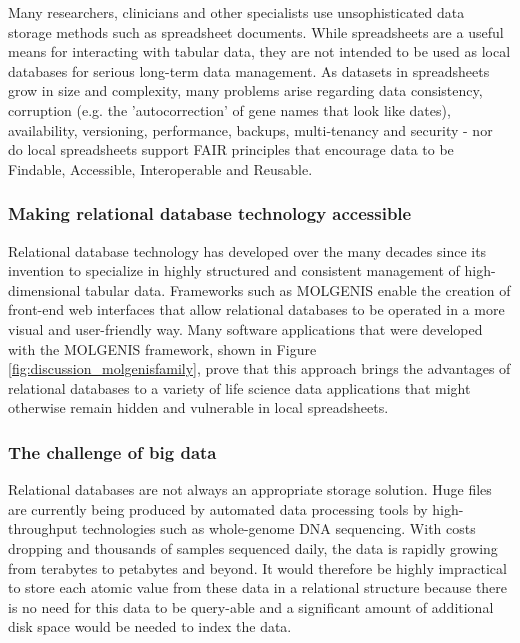 Many researchers, clinicians and other specialists use unsophisticated data storage methods such as spreadsheet documents.
While spreadsheets are a useful means for interacting with tabular data, they are not intended to be used as local databases for serious long-term data management.
As datasets in spreadsheets grow in size and complexity, many problems arise regarding data consistency\cite{Ziemann_2016}, corruption (e.g. the 'autocorrection' of gene names that look like dates\cite{Zeeberg_2004}), availability, versioning, performance, backups, multi-tenancy and security - nor do local spreadsheets support FAIR principles\cite{Wilkinson_2016,Wilkinson_2017} that encourage data to be Findable, Accessible, Interoperable and Reusable.

\subsubsection*{Making relational database technology accessible}

Relational database technology has developed over the many decades since its invention\cite{Codd_1970} to specialize in highly structured and consistent management of high-dimensional tabular data.
Frameworks such as MOLGENIS enable the creation of front-end web interfaces that allow relational databases to be operated in a more visual and user-friendly way.
Many software applications that were developed with the MOLGENIS framework, shown in Figure \ref{fig:discussion_molgenisfamily}, prove that this approach brings the advantages of relational databases to a variety of life science data applications that might otherwise remain hidden and vulnerable in local spreadsheets.

\subsubsection*{The challenge of big data}

Relational databases are not always an appropriate storage solution.
Huge files are currently being produced by automated data processing tools by high-throughput technologies such as whole-genome DNA sequencing.
With costs dropping and thousands of samples sequenced daily, the data is rapidly growing from terabytes to petabytes and beyond.
It would therefore be highly impractical to store each atomic value from these data in a relational structure because there is no need for this data to be query-able and a significant amount of additional disk space would be needed to index the data.

